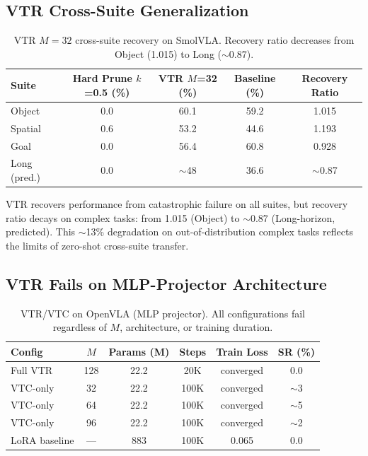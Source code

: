 \documentclass[letterpaper]{article}
\begin{document}
\subsection{VTR Cross-Suite Generalization}

\begin{table}[h]
\centering
\caption{VTR $M=32$ cross-suite recovery on SmolVLA. Recovery ratio decreases from Object (1.015) to Long ($\sim$0.87).}
\label{tab:vtr_cross_suite}
\begin{tabular}{lcccc}
\toprule
Suite & Hard Prune $k$=0.5 (\%) & VTR $M$=32 (\%) & Baseline (\%) & Recovery Ratio \\
\midrule
Object & 0.0 & 60.1 & 59.2 & 1.015 \\
Spatial & 0.6 & 53.2 & 44.6 & 1.193 \\
Goal & 0.0 & 56.4 & 60.8 & 0.928 \\
Long (pred.) & 0.0 & $\sim$48 & 36.6 & $\sim$0.87 \\
\bottomrule
\end{tabular}
\end{table}

VTR recovers performance from catastrophic failure on all suites, but recovery ratio decays on complex tasks: from 1.015 (Object) to $\sim$0.87 (Long-horizon, predicted).
This $\sim$13\% degradation on out-of-distribution complex tasks reflects the limits of zero-shot cross-suite transfer.

\subsection{VTR Fails on MLP-Projector Architecture}

\begin{table}[h]
\centering
\caption{VTR/VTC on OpenVLA (MLP projector). All configurations fail regardless of $M$, architecture, or training duration.}
\label{tab:vtr_openvla}
\begin{tabular}{lccccc}
\toprule
Config & $M$ & Params (M) & Steps & Train Loss & SR (\%) \\
\midrule
Full VTR & 128 & 22.2 & 20K & converged & 0.0 \\
VTC-only & 32 & 22.2 & 100K & converged & $\sim$3 \\
VTC-only & 64 & 22.2 & 100K & converged & $\sim$5 \\
VTC-only & 96 & 22.2 & 100K & converged & $\sim$2 \\
LoRA baseline & --- & 883 & 100K & 0.065 & 0.0 \\
\bottomrule
\end{tabular}
\end{table}
\end{document}

